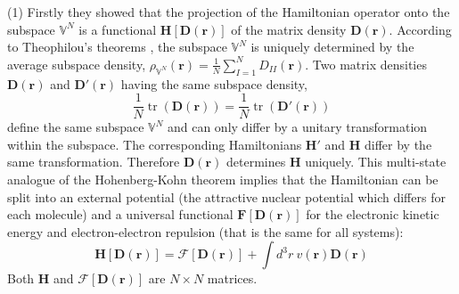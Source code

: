 \documentclass[journal=jacsat,manuscript=article]{achemso}
\DeclareMathOperator{\tr}{tr}
\newcommand\m[1]{\mathbf{#1}}
\renewcommand\vec[1]{\mathbf{#1}}
\begin{document}
(1) Firstly they showed that the projection of the Hamiltonian operator onto the subspace $\mathbb{V}^N$ is a functional $\m{H}[\m{D}(\vec{r})]$ of the
matrix density $\m{D}(\vec{r})$. \cite[theorem 1]{Lu2022JPCL}
According to Theophilou's theorems \cite{Theophilou1979},
the subspace $\mathbb{V}^{N}$ is uniquely determined
by the average subspace density, $\rho_{\mathbb{V}^N}(\vec{r}) = \frac{1}{N} \sum_{I=1}^N D_{II}(\vec{r})$. Two matrix densities
$\m{D}(\vec{r})$ and $\m{D}'(\vec{r})$ having the same subspace density,
\begin{equation}
\frac{1}{N} \tr(\m{D}(\vec{r})) = \frac{1}{N} \tr(\m{D}'(\vec{r}))
\end{equation}
define the same subspace $\mathbb{V}^{N}$ and can only differ by a unitary transformation within the subspace. The
corresponding Hamiltonians $\m{H}'$ and $\m{H}$ differ by the same transformation. Therefore  $\m{D}(\vec{r})$
determines $\m{H}$ uniquely.
This multi-state analogue of the Hohenberg-Kohn theorem implies that the Hamiltonian can be split into an
external potential (the attractive nuclear potential which differs for each molecule) and a universal functional $\m{F}[\m{D}(\vec{r})]$ for the
electronic kinetic energy and electron-electron repulsion (that is the same for all systems):
\begin{equation}
 \m{H}[\m{D}(\vec{r})] = \m{\mathcal{F}}[\m{D}(\vec{r})] + \int d^3\!r ~ v(\vec{r}) \m{D}(\vec{r})
\end{equation}
Both $\m{H}$ and $\m{\mathcal{F}}[\m{D}(\vec{r})]$ are $N \times N$ matrices.
\end{document}
